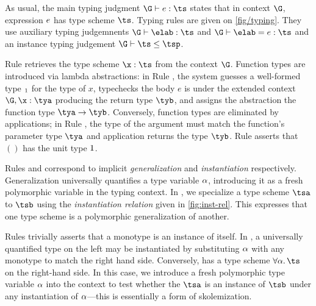 \documentclass[acmsmall,screen,nonacm]{acmart}
\begin{document}
As usual, the main typing judgment $\G \th \e : \ts$ states that in context
$\G$, expression $e$ has type scheme $\ts$.  Typing rules are given on
\cref {fig/typing}.  They use auxiliary typing judgemnents $\G \th \elab :
\ts$ and $\G \th \elab = \e : \ts$ and an instance typing judgement
$\mlsub [\G] \ts \tsp$.



Rule  retrieves the type scheme $\x : \ts$ from the context $\G$.
Function types are introduced via lambda abstractions: in Rule , the
system guesses a well-formed type $\relax_1$ for the type of $x$, typechecks
the body $e$ is under the extended context $\G, \x : \tya$ producing the
return type $\tyb$, and assigns the abstraction the function type
$\tya \to \tyb$. Conversely, function types are eliminated by applications;
in Rule , the type of the argument must match the function's parameter
type $\tya$ and application returns the type $\tyb$. Rule  asserts
that $()$ has the unit type $1$.


Rules  and  correspond to implicit
\textit{generalization} and \textit{instantiation} respectively.
Generalization universally quantifies a type variable $\alpha$, introducing it
as a fresh polymorphic variable in the typing context. In , we
specialize a type scheme $\tsa$ to $\tsb$ using the \emph{instantiation
relation} given in \cref{fig:inst-rel}.  This expresses that one type scheme
is a polymorphic generalization of another.


Rules  trivially asserts that a monotype is an instance of
itself. In , a universally quantified type on the left may be
instantiated by substituting $\alpha$ with any monotype to match the right hand
side. Conversely,  has a type scheme $\tfor \tv \ts$ on the
right-hand side. In this case, we introduce a fresh polymorphic type variable
$\alpha$ into the context to test whether the $\tsa$ is an instance of $\tsb$
under any instantiation of $\alpha$---this is essentially a form of skolemization.
\end{document}
